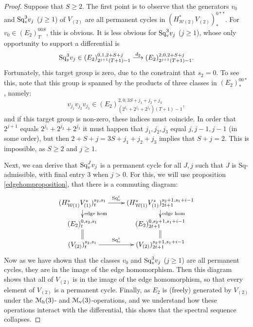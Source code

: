 \documentclass[11pt]{amsart}
\theoremstyle{plain}
\theoremstyle{definition}
\renewcommand{\to}{\longrightarrow}
\newcommand{\calw}{\mathcal{W}}
\newcommand{\calmv}{\mathcal{M}_\textup{v}}
\newcommand{\calmh}{\mathcal{M}_\textup{h}}
\theoremstyle{plain}
\newcommand{\Sq}{\mathrm{Sq}}
\newcommand{\Sqv}{\mathrm{Sq}_\textup{v}}
\begin{document}
\begin{Calculations of HWn for n nonzero}
\begin{proof}
Suppose that $S\geq2$. The first point is to observe that the generators $v_0$ and $\Sqv^3v_j$ ($j\geq1$) of $V_{(2)}$ are all permanent cycles in
$(H^*_{\calw(2)}V_{(2)})^{0**}_{*}$. For $v_0\in (E_2)^{00S}_{T}$, this is obvious. It is less obvious for $\Sqv^3v_j$ ($j\geq1$), whose only opportunity to support a differential is
\[\Sqv^3v_j\in (E_2)^{0,1,2+S+j}_{2^{j+1}(T+1)-1}\overset{d_2}{\to}(E_2)^{2,0,2+S+j}_{2^{j+1}(T+1)-1}.\]
Fortunately, this target group is zero, due to the constraint that $s_2=0$. To see this, note that this group is spanned by the products of three classes in $(E_{2})^{00*}_*$, namely:
\[v_{j_1}v_{j_2}v_{j_3}\in (E_{2})^{2,0,3S+j_1+j_2+j_3}_{(2^{j_1}+2^{j_2}+2^{j_3})(T+1)-1},\]
and if this target group is non-zero, these indices must coincide.
In order that $2^{j+1}$ equals $2^{j_{1}}+2^{j_{2}}+2^{j_{3}}$ it must happen that $j_1,j_2,j_3$ equal $j,j-1,j-1$ (in some order), but then $2+S+j=3S+j_1+j_2+j_3$ implies that $S+j=2$. This is impossible, as $S\geq2$ and $j\geq1$.

Next, we can derive that $\Sqv^Jv_j$ is a permanent cycle for all $J,j$ such that $J$ is $\Sq$-admissible, with final entry 3 when $j>0$. For this, we will use  proposition \ref{edgehomproposition}, that there is a commuting diagram:%
\[\xymatrix@R=4mm{
(H^*_{\calw(1)}V^*_{(1)})^{s_{2},s_1}_t\ar[r]^-{\Sqv^i}
\ar[d]^-{\textup{edge hom}}
&%
(H^*_{\calw(1)}V^*_{(1)})^{s_{2}+1,s_1+i-1}_{2t+1}\ar[d]^-{\textup{edge hom}}
\\%
(E_{2})^{0,s_{2},s_1}_t\ar@{=}[d]%
&%
(E_2)^{0,s_{2}+1,s_1+i-1}_{2t+1}\ar@{=}[d]\\
(V_{(2)})^{s_{2},s_1}_t\ar[r]^-{\Sqv^i}
&%
(V_{(2)})^{s_{2}+1,s_1+i-1}_{2t+1}
}\]
Now as we have shown that the classes $v_0$ and $\Sqv^{3}v_j$  ($j\geq1$) are all permanent cycles, they are in the image of the edge homomorphism. Then this diagram shows that all of $V_{(2)}$ is in the image of the edge homomorphism, so that every element  of $V_{(2)}$ is a permanent cycle. Finally, as $E_{2}$ is (freely) generated by $V_{(2)}$ under the $\calmh(3)$- and $\calmv(3)$-operations, and we understand how these operations interact with the differential, this shows that the spectral sequence collapses.


\end{proof}
\end{Calculations of HWn for n nonzero}
\end{document}
